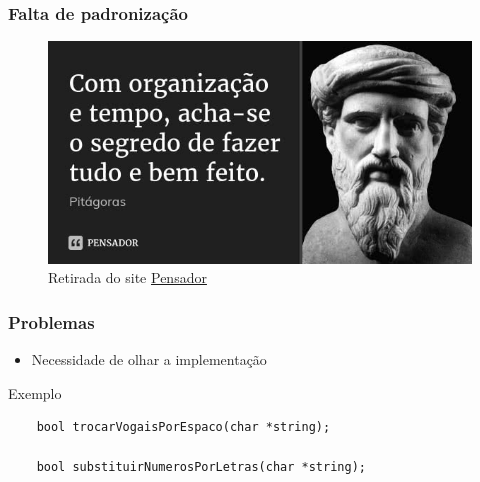 \begin{frame}
	\frametitle{Falta de padronização}

	\begin{figure}[h]
		\centering
			\includegraphics[height=0.6\paperheight]{figuras/pitagoras}
		\caption{Retirada do site \href{https://www.pensador.com/frase/Mzg3/}{Pensador}}\label{figure:pitagoras}
	\end{figure}

\end{frame}

\begin{frame}
	\frametitle{Problemas}

	\begin{itemize}
		\item Necessidade de olhar a implementação
	\end{itemize}

\end{frame}

\begin{frame}
	\Huge Exemplo
\end{frame}

\begin{frame}[fragile]

	\begin{listing}[H]
		\begin{verbatim}
	bool trocarVogaisPorEspaco(char *string);

	bool substituirNumerosPorLetras(char *string);
		\end{verbatim}
	\end{listing}

\end{frame}

